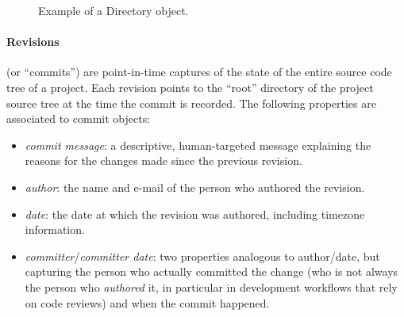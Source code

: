 \begin{figure}[ht]
    \centering
\caption{Example of a Directory object.}%
\label{fig:directory-example}
\end{figure}



\begin{figure}\centering
{}
\end{figure}
\paragraph{\textbf{Revisions}} (or ``commits'') are point-in-time captures of
the state of the entire source code tree of a project. Each revision points to
the ``root'' directory of the project source tree at the time the commit is
recorded. The following properties are associated to commit objects:

\begin{itemize}
    \setlength\itemsep{0em}
    \item \emph{commit message}: a descriptive, human-targeted message
        explaining the reasons for the changes made since the previous
        revision.
    \item \emph{author}: the name and e-mail of the person who authored the
        revision.
    \item \emph{date}: the date at which the revision was authored, including
        timezone information.
    \item \emph{committer}/\emph{committer date}: two properties analogous to
        author/date, but capturing the person who actually committed the change
        (who is not always the person who \emph{authored} it, in particular in
        development workflows that rely on code reviews) and when the commit
        happened.
\end{itemize}

